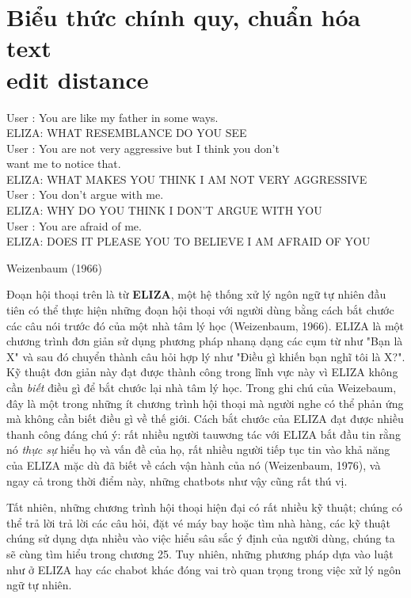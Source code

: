 \setcounter{chapter}{1}

\chapter{Biểu thức chính quy, chuẩn hóa text\\edit distance}
\setlength\epigraphwidth{\textwidth}
\epigraphfontsize{\small}
\epigraph{
{\selectfont
User : You are like my father in some ways. \\
ELIZA: WHAT RESEMBLANCE DO YOU SEE \\
User : You are not very aggressive but I think you don’t \\
\hspace{38pt} want me to notice that. \\
ELIZA: WHAT MAKES YOU THINK I AM NOT VERY AGGRESSIVE \\
User : You don’t argue with me. \\
ELIZA: WHY DO YOU THINK I DON’T ARGUE WITH YOU \\
User : You are afraid of me. \\
ELIZA: DOES IT PLEASE YOU TO BELIEVE I AM AFRAID OF YOU\\
}
}{Weizenbaum (1966)}

Đoạn hội thoại trên là từ \textbf{ELIZA}, một hệ thống xử lý ngôn ngữ tự nhiên đầu tiên có thể thực hiện những đoạn hội thoại với người dùng bằng cách bắt chước các câu nói trước đó của một nhà tâm lý học (Weizenbaum, 1966). ELIZA là một chương trình đơn giản sử dụng phương pháp nhanạ dạng các cụm từ như "Bạn là X" và sau đó chuyển thành câu hỏi hợp lý như "Điều gì khiến bạn nghĩ tôi là X?". Kỹ thuật đơn giản này đạt được thành công trong lĩnh vực này vì ELIZA không cần \textit{biết} điều gì để bắt chước lại nhà tâm lý học. Trong ghi chú của Weizebaum, đây là một trong những ít chương trình hội thoại mà người nghe có thể phản ứng mà không cần biết điều gì về thế giới. Cách bắt chước của ELIZA đạt được nhiều thanh công đáng chú ý: rất nhiều người tauwơng tác với ELIZA bắt đầu tin rằng nó \textit{thực sự} hiểu họ và vấn đề của họ, rất nhiều người tiếp tục tin vào khả năng của ELIZA mặc dù đã biết về cách vận hành của nó (Weizenbaum, 1976), và ngay cả trong thời điểm này, những chatbots như vậy cũng rất thú vị.

Tất nhiên, những chương trình hội thoại hiện đại có rất nhiều kỹ thuật; chúng có thể trả lời trả lời các câu hỏi, đặt vé máy bay hoặc tìm nhà hàng, các kỹ thuật chúng sử dụng dựa nhiều vào việc hiểu sâu sắc ý định của người dùng, chúng ta sẽ cùng tìm hiểu trong chương 25. Tuy nhiên, những phương pháp dựa vào luật như ở ELIZA hay các chabot khác đóng vai trò quan trọng trong việc xử lý ngôn ngữ tự nhiên.


